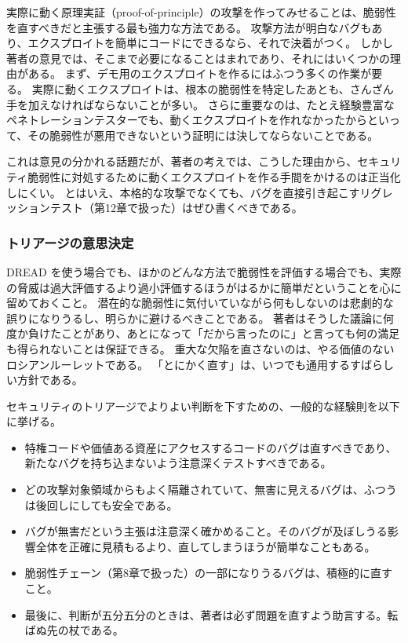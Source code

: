 \documentclass[uplatex]{jsarticle}
\begin{document}
実際に動く原理実証（proof-of-principle）の攻撃を作ってみせることは、脆弱性を直すべきだと主張する最も強力な方法である。
攻撃方法が明白なバグもあり、エクスプロイトを簡単にコードにできるなら、それで決着がつく。
しかし著者の意見では、そこまで必要になることはまれであり、それにはいくつかの理由がある。
まず、デモ用のエクスプロイトを作るにはふつう多くの作業が要る。
実際に動くエクスプロイトは、根本の脆弱性を特定したあとも、さんざん手を加えなければならないことが多い。
さらに重要なのは、たとえ経験豊富なペネトレーションテスターでも、動くエクスプロイトを作れなかったからといって、その脆弱性が悪用できないという証明には決してならないことである。

これは意見の分かれる話題だが、著者の考えでは、こうした理由から、セキュリティ脆弱性に対処するために動くエクスプロイトを作る手間をかけるのは正当化しにくい。
とはいえ、本格的な攻撃でなくても、バグを直接引き起こすリグレッションテスト（第12章で扱った）はぜひ書くべきである。

\subsubsection{トリアージの意思決定}

DREAD を使う場合でも、ほかのどんな方法で脆弱性を評価する場合でも、実際の脅威は過大評価するより過小評価するほうがはるかに簡単だということを心に留めておくこと。
潜在的な脆弱性に気付いていながら何もしないのは悲劇的な誤りになりうるし、明らかに避けるべきことである。
著者はそうした議論に何度か負けたことがあり、あとになって「だから言ったのに」と言っても何の満足も得られないことは保証できる。
重大な欠陥を直さないのは、やる価値のないロシアンルーレットである。
「とにかく直す」は、いつでも通用するすばらしい方針である。

セキュリティのトリアージでよりよい判断を下すための、一般的な経験則を以下に挙げる。
\begin{itemize}
\item 特権コードや価値ある資産にアクセスするコードのバグは直すべきであり、新たなバグを持ち込まないよう注意深くテストすべきである。
\item どの攻撃対象領域からもよく隔離されていて、無害に見えるバグは、ふつうは後回しにしても安全である。
\item バグが無害だという主張は注意深く確かめること。そのバグが及ぼしうる影響全体を正確に見積もるより、直してしまうほうが簡単なこともある。
\item 脆弱性チェーン（第8章で扱った）の一部になりうるバグは、積極的に直すこと。
\item 最後に、判断が五分五分のときは、著者は必ず問題を直すよう助言する。転ばぬ先の杖である。
\end{itemize}
\end{document}
